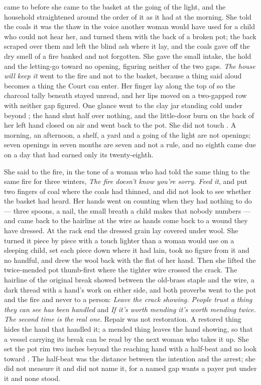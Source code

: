  came to  before she came to the basket at the going of the light, and the household straightened around the order of it as it had at the morning. She told the coals it was the thaw in the voice another woman would have used for a child who could not hear her, and turned them with the back of a broken pot; the back scraped over them and left the blind ash where it lay, and the coals gave off the dry smell of a fire banked and not forgotten. She gave the small intake, the hold and the letting-go toward no opening, figuring neither of the two gaps. \emph{The house will keep it} went to the fire and not to the basket, because a thing said aloud becomes a thing the Court can enter. Her finger lay along the top of  so the charcoal tally beneath stayed unread, and her lips moved on a two-gapped row with neither gap figured. One glance went to the clay jar standing cold under  beyond ; the hand shut half over nothing, and the little-door burn on the back of her left hand closed on air and went back to the pot. She did not touch . A morning, an afternoon, a shelf, a yard and a going of the light are not openings; seven openings in seven months are seven and not a rule, and no eighth came due on a day that had earned only its twenty-eighth.

She said to the fire, in the tone of a woman who had told the same thing to the same fire for three winters, \emph{The fire doesn't know you're sorry. Feed it}, and put two fingers of coal where the coals had thinned, and did not look to see whether the basket had heard. Her hands went on counting when they had nothing to do --- three spoons, a nail, the small breath a child makes that nobody numbers --- and came back to the hairline at the wire as hands come back to a wound they have dressed. At the rack end the dressed grain lay covered under wool. She turned it piece by piece with a touch lighter than a woman would use on a sleeping child, set each piece down where it had lain, took no figure from it and no handful, and drew the wool back with the flat of her hand. Then she lifted the twice-mended pot thumb-first where the tighter wire crossed the crack. The hairline of the original break showed between the old-brass staple and the wire, a dark thread with a hand's work on either side, and both proverbs went to the pot and the fire and never to a person: \emph{Leave the crack showing. People trust a thing they can see has been handled} and \emph{If it's worth mending it's worth mending twice. The second time is the real one}. Repair was not restoration. A restored thing hides the hand that handled it; a mended thing leaves the hand showing, so that a vessel carrying its break can be read by the next woman who takes it up. She set the pot rim two inches beyond the reaching hand with a half-beat and no look toward . The half-beat was the distance between the intention and the arrest; she did not measure it and did not name it, for a named gap wants a payer put under it and none stood.

